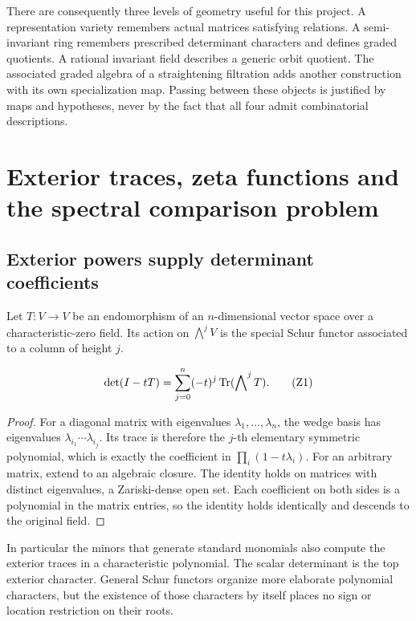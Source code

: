 There are consequently three levels of geometry useful for this project. A representation variety remembers actual matrices satisfying relations. A semi-invariant ring remembers prescribed determinant characters and defines graded quotients. A rational invariant field describes a generic orbit quotient. The associated graded algebra of a straightening filtration adds another construction with its own specialization map. Passing between these objects is justified by maps and hypotheses, never by the fact that all four admit combinatorial descriptions.

\chapter{Exterior traces, zeta functions and the spectral comparison problem}
\label{ch:exterior-zeta}

\section{Exterior powers supply determinant coefficients}
Let \(T:V\to V\) be an endomorphism of an \(n\)-dimensional vector space over a characteristic-zero field. Its action on \(\bigwedge^jV\) is the special Schur functor associated to a column of height \(j\).

\begin{theorem}
\[
 \det(I-tT)=\sum_{j=0}^n(-t)^j\operatorname{Tr}(\bigwedge\nolimits^j T).
 \tag{Z1}\label{eq:exterior-characteristic}
\]
\end{theorem}
\begin{proof}
For a diagonal matrix with eigenvalues \(\lambda_1,\ldots,\lambda_n\), the wedge basis has eigenvalues \(\lambda_{i_1}\cdots\lambda_{i_j}\). Its trace is therefore the \(j\)-th elementary symmetric polynomial, which is exactly the coefficient in \(\prod_i(1-t\lambda_i)\). For an arbitrary matrix, extend to an algebraic closure. The identity holds on matrices with distinct eigenvalues, a Zariski-dense open set. Each coefficient on both sides is a polynomial in the matrix entries, so the identity holds identically and descends to the original field.
\end{proof}
In particular the minors that generate standard monomials also compute the exterior traces in a characteristic polynomial. The scalar determinant is the top exterior character. General Schur functors organize more elaborate polynomial characters, but the existence of those characters by itself places no sign or location restriction on their roots.

